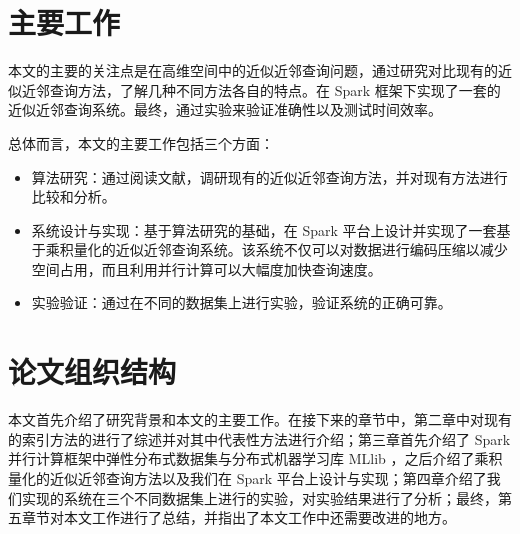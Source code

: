 \section{主要工作}
本文的主要的关注点是在高维空间中的近似近邻查询问题，通过研究对比现有的近似近邻查询方法，了解几种不同方法各自的特点。在 Spark 框架下实现了一套的近似近邻查询系统。最终，通过实验来验证准确性以及测试时间效率。

总体而言，本文的主要工作包括三个方面：
\begin{itemize}
\item 算法研究：通过阅读文献，调研现有的近似近邻查询方法，并对现有方法进行比较和分析。
\item 系统设计与实现：基于算法研究的基础，在 Spark 平台上设计并实现了一套基于乘积量化的近似近邻查询系统。该系统不仅可以对数据进行编码压缩以减少空间占用，而且利用并行计算可以大幅度加快查询速度。
\item 实验验证：通过在不同的数据集上进行实验，验证系统的正确可靠。
\end{itemize}

\section{论文组织结构}
本文首先介绍了研究背景和本文的主要工作。在接下来的章节中，第二章中对现有的索引方法的进行了综述并对其中代表性方法进行介绍；第三章首先介绍了 Spark 并行计算框架中弹性分布式数据集与分布式机器学习库 MLlib ，之后介绍了乘积量化的近似近邻查询方法以及我们在 Spark 平台上设计与实现；第四章介绍了我们实现的系统在三个不同数据集上进行的实验，对实验结果进行了分析；最终，第五章节对本文工作进行了总结，并指出了本文工作中还需要改进的地方。
